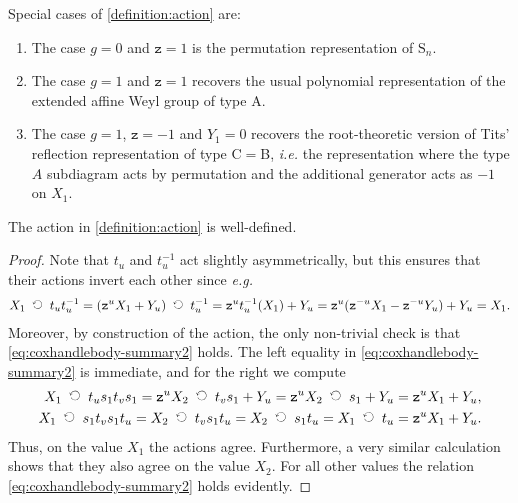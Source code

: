 \documentclass[a4paper,11pt]{amsart}
\newcommand{\ie}{\textsl{i.e.}}
\newcommand{\eg}{\textsl{e.g.}}
\newcommand{\actsright}{\mathop{\,\;\raisebox{0ex}{\rotatebox{90}{$\circlearrowleft$}}\;\,}}
\newcommand{\setstuff}[1]{\mathrm{#1}}
\newcommand{\varsym}[1]{\mathtt{#1}}
\newcommand{\zvar}{\varsym{z}}
\numberwithin{equation}{section}
\let\fullref\autoref
\begin{document}
\begin{remark}\label{remark:action}
Special cases of \fullref{definition:action} are:	
\begin{enumerate}

\item The case $g=0$ and $\zvar=1$ is the permutation 
representation of $\setstuff{S}_{n}$.

\item The case $g=1$ and $\zvar=1$ recovers the usual 
polynomial representation of the extended affine Weyl group of type A.

\item The case $g=1$, $\zvar=-1$ and $Y_{1}=0$ recovers 
the root-theoretic version of Tits' reflection representation 
of type C$=$B, {\ie} the representation where the type 
$A$ subdiagram acts by permutation and the 
additional generator acts as 
$-1$ on $X_{1}$.
\end{enumerate}
\end{remark}

\begin{lemma}\label{lemma:action}
The action in \fullref{definition:action} is well-defined.
\end{lemma}

\begin{proof}
Note that 
$t_{u}$ and $t_{u}^{-1}$ act slightly asymmetrically, 
but this ensures that their actions invert each other since {\eg}
\begin{gather*}
X_{1}\actsright t_{u}t_{u}^{-1}
=
(\zvar^{u}X_{1}+Y_{u})\actsright t_{u}^{-1}
=
\zvar^{u}t_{u}^{-1}(X_{1})+Y_{u}
=
\zvar^{u}(\zvar^{-u}X_{1}-\zvar^{-u}Y_{u})+Y_{u}
=
X_{1}.
\end{gather*}
Moreover, by construction of the action, the only 
non-trivial check is that 
\eqref{eq:coxhandlebody-summary2} holds.
The left equality in \eqref{eq:coxhandlebody-summary2} 
is immediate, and for the right we compute
\begin{gather*}
\begin{aligned}
X_{1}\actsright t_{u}s_{1}t_{v}s_{1}
=\zvar^{u}X_{2}\actsright t_{v}s_{1}+Y_{u}
=\zvar^{u}X_{2}\actsright s_{1}+Y_{u}
&=\zvar^{u}X_{1}+Y_{u},
\\
X_{1}\actsright s_{1}t_{v}s_{1}t_{u}=
X_{2}\actsright t_{v}s_{1}t_{u}
=X_{2}\actsright s_{1}t_{u}
=X_{1}\actsright t_{u}
&=\zvar^{u}X_{1}+Y_{u}.
\end{aligned}
\end{gather*}
Thus, on the value $X_{1}$ the actions agree. Furthermore, 
a very similar calculation 
shows that they also agree on the value $X_{2}$.
For all other values the relation \eqref{eq:coxhandlebody-summary2} 
holds evidently.
\end{proof}
\end{document}
